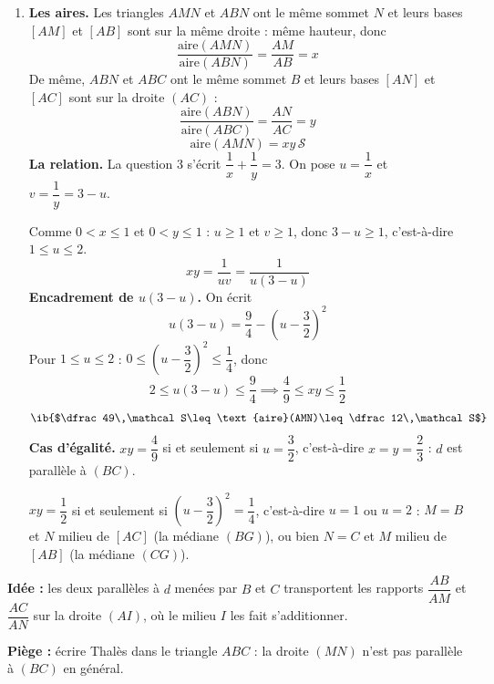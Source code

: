 \begin{enumerate}
  \item \textbf{Les aires.} Les triangles $AMN$ et $ABN$ ont le même sommet $N$ et leurs bases $[AM]$ et $[AB]$ sont sur la même droite : même hauteur, donc
  \[\dfrac{\text{aire}(AMN)}{\text{aire}(ABN)}=\dfrac{AM}{AB}=x\]
  De même, $ABN$ et $ABC$ ont le même sommet $B$ et leurs bases $[AN]$ et $[AC]$ sont sur la droite $(AC)$ :
  \[\dfrac{\text{aire}(ABN)}{\text{aire}(ABC)}=\dfrac{AN}{AC}=y\]
  \[\text{aire}(AMN)=xy\,\mathcal S\]
  \textbf{La relation.} La question 3 s'écrit $\dfrac1x+\dfrac1y=3$. On pose $u=\dfrac1x$ et $v=\dfrac1y=3-u$.

  Comme $0<x\leq1$ et $0<y\leq1$ : $u\geq1$ et $v\geq1$, donc $3-u\geq1$, c'est-à-dire $1\leq u\leq2$.
  \[xy=\dfrac1{uv}=\dfrac1{u(3-u)}\]
  \textbf{Encadrement de $u(3-u)$.} On écrit
  \[u(3-u)=\dfrac94-\left(u-\dfrac32\right)^2\]
  Pour $1\leq u\leq2$ : $0\leq\left(u-\dfrac32\right)^2\leq\dfrac14$, donc
  \[2\leq u(3-u)\leq\dfrac94\implies\dfrac49\leq xy\leq\dfrac12\]
  \[\ib{$\dfrac49\,\mathcal S\leq\text{aire}(AMN)\leq\dfrac12\,\mathcal S$}\]
  \textbf{Cas d'égalité.} $xy=\dfrac49$ si et seulement si $u=\dfrac32$, c'est-à-dire $x=y=\dfrac23$ : $d$ est parallèle à $(BC)$.

  $xy=\dfrac12$ si et seulement si $\left(u-\dfrac32\right)^2=\dfrac14$, c'est-à-dire $u=1$ ou $u=2$ : $M=B$ et $N$ milieu de $[AC]$ (la médiane $(BG)$), ou bien $N=C$ et $M$ milieu de $[AB]$ (la médiane $(CG)$).
\end{enumerate}
\textbf{Idée :} les deux parallèles à $d$ menées par $B$ et $C$ transportent les rapports $\dfrac{AB}{AM}$ et $\dfrac{AC}{AN}$ sur la droite $(AI)$, où le milieu $I$ les fait s'additionner.

\textbf{Piège :} écrire Thalès dans le triangle $ABC$ : la droite $(MN)$ n'est pas parallèle à $(BC)$ en général.
